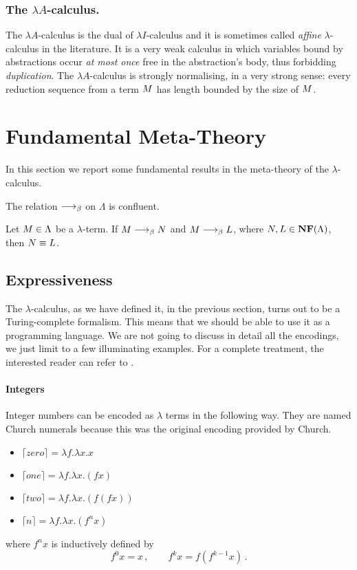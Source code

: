 \subsubsection{The $\lambda A$-calculus.}
The $\lambda A$-calculus is the dual of $\lambda I$-calculus and it is
sometimes called \emph{affine} $\lambda$-calculus in the
literature. It is a very weak calculus in which variables bound by
abstractions occur \emph{at most once} free in the abstraction's body,
thus forbidding \emph{duplication}. The $\lambda A$-calculus is strongly
normalising, in a very strong sense: every reduction sequence from a term
$M$ has length bounded by the size of $M$.
\section{Fundamental Meta-Theory}
In this section we report some fundamental results in the meta-theory of the $\lambda$-calculus.
\begin{theorem}
	The relation $\longrightarrow_\beta$ on $\Lambda$ is confluent.
\end{theorem}
\begin{corollary}
	Let $M\in\Lambda$ be a $\lambda$-term. If $M\longrightarrow_\beta N$ and $M\longrightarrow_\beta L$, where $N,L\in\textbf{NF}(\Lambda)$, then $N\equiv L$.
\end{corollary}
\subsection{Expressiveness}
The $\lambda$-calculus, as we have defined it, in the previous section, turns out to be a Turing-complete formalism. This means that we should be able to use it as a programming language. We are not going to discuss in detail all the encodings, we just limit to a few illuminating examples. For a complete treatment, the interested reader can refer to \cite{barendregt_lambda_1984}.
\paragraph{Integers}
Integer numbers can be encoded as $\lambda$ terms in the following way. They are named Church numerals because this was the original encoding provided by Church.
\begin{itemize}
	\item $\lceil zero\rceil=\lambda f.\lambda x.x$
	\item $\lceil one\rceil=\lambda f.\lambda x.(fx)$
	\item $\lceil two\rceil=\lambda f.\lambda x.(f(fx))$
	\item $\lceil n\rceil=\lambda f.\lambda x.(f^nx)$
\end{itemize}
where $f^nx$ is inductively defined by
$$
f^0x=x\,,\qquad f^kx=f(f^{k-1}x)\,.
$$
